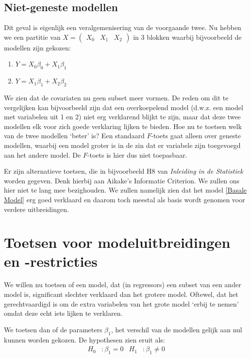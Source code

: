 \documentclass[a4paper]{report}
\begin{document}
\subsection{Niet-geneste modellen}
\label{niet genest}

  Dit geval is eigenlijk een veralgemenisering van de voorgaande twee. Nu hebben we een partitie van $X = \begin{pmatrix} X_0 & X_1 & X_2 \end{pmatrix}$ in 3 blokken waarbij bijvoorbeeld de modellen zijn gekozen:
  
  \begin{enumerate}
    \item $Y = X_0\beta_0 + X_1 \beta_1$
    \item $Y = X_1\beta_1 + X_2 \beta_2$
  \end{enumerate}
  
  We zien dat de covariaten nu geen subset meer vormen. De reden om dit te vergelijken kan bijvoorbeeld zijn dat een overkoepelend model (d.w.z. een model met variabelen uit 1 en 2) niet erg verklarend blijkt te zijn, maar dat deze twee modellen elk voor zich goede verklaring lijken te bieden. Hoe nu te toetsen welk van de twee modellen `beter' is? Een standaard $F$-toets gaat alleen over geneste modellen, waarbij een model groter is in de zin dat er variabele zijn toegevoegd aan het andere model. De $F$-toets is hier dus niet toepasbaar. 
  
  Er zijn alternatieve toetsen, die in bijvoorbeeld H8 van \emph{Inleiding in de Statistiek} worden gegeven. Denk hierbij aan Aikake's Informatie Criterion. We zullen ons hier niet te lang mee bezighouden. We zullen namelijk zien dat het model \ref{Basale Model} erg goed verklaard en daarom toch meestal als basis wordt genomen voor verdere uitbreidingen.
  
\section{Toetsen voor modeluitbreidingen en -restricties}

  We willen nu toetsen of een model, dat (in regressors) een subset van een ander model is, significant slechter verklaard dan het grotere model. Oftewel, dat het gerechtvaardigd is om de extra variabelen van het grote model `erbij te nemen' omdat deze echt iets lijken te verklaren. 
  
  We toetsen dan of de parameters $\beta_1$, het verschil van de modellen gelijk aan nul kunnen worden gekozen. De hypothesen zien eruit als:
  \begin{align*}
  H_0 &: \beta_1 = 0 & H_1 &: \beta_1 \neq 0
  \end{align*}
  
\end{document}
